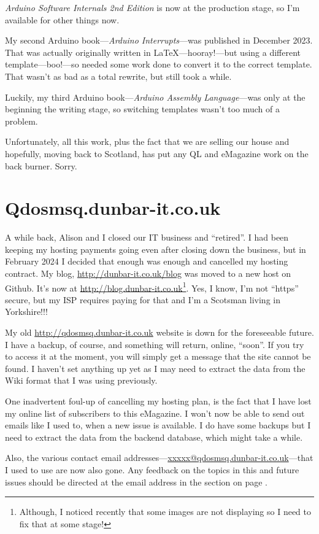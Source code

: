 \emph{Arduino Software Internals 2nd Edition} is now at the production stage, so I'm available for other things now.

My second Arduino book---\emph{Arduino Interrupts}---was published in December 2023. That was actually originally written in \LaTeX{}---hooray!---but using a different template---boo!---so needed some work done to convert it to the correct template. That wasn't as bad as a total rewrite, but still took a while.

Luckily, my third Arduino book---\emph{Arduino Assembly Language}---was only at the beginning the writing stage, so switching templates wasn't too much of a problem.

Unfortunately, all this work, plus the fact that we are selling our house and hopefully, moving back to Scotland, has put any QL and eMagazine work on the back burner. Sorry.


\section{Qdosmsq.dunbar-it.co.uk}

A while back, Alison and I closed our IT business and ``retired''. I had been keeping my hosting payments going even after closing down the business, but in February 2024 I decided that enough was enough and cancelled my hosting contract. My blog, \url{http://dunbar-it.co.uk/blog} was moved to a new host on Github. It's now at \url{http://blog.dunbar-it.co.uk}\footnote{Although, I noticed recently that some images are not displaying so I need to fix that at some stage!}. Yes, I know, I'm not ``https'' secure, but my ISP requires paying for that and I'm a Scotsman living in Yorkshire!!!

My old \url{http://qdosmsq.dunbar-it.co.uk} website is down for the foreseeable future. I have a backup, of course, and something will return, online, ``soon''. If you try to access it at the moment, you will simply get a message that the site cannot be found. I haven't set anything up yet as I may need to extract the data from the Wiki format that I was using previously.

One inadvertent foul-up of cancelling my hosting plan, is the fact that I have lost my online list of subscribers to this eMagazine. I won't now be able to send out emails like I used to, when a new issue is available. I do have some backups but I need to extract the data from the backend database, which might take a while.

Also, the various contact email addresses---\url{xxxxx@qdosmsq.dunbar-it.co.uk}---that I used to use are now also gone. Any feedback on the topics in this and future issues should be directed at the email address in the  section on page \pageref{section: feedback}.

